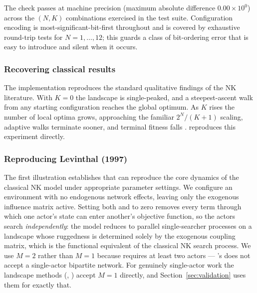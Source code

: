 \documentclass[
  article]{jss}
\begin{document}
The check passes at machine precision (maximum absolute difference
\(0.00 \times 10^{0}\)) across the \((N, K)\) combinations exercised in
the test suite. Configuration encoding is most-significant-bit-first
throughout and is covered by exhaustive round-trip tests for
\(N = 1, \ldots, 12\); this guards a class of bit-ordering error that is
easy to introduce and silent when it occurs.

\subsubsection{Recovering classical
results}\label{recovering-classical-results}

The implementation reproduces the standard qualitative findings of the
NK literature. With \(K = 0\) the landscape is single-peaked, and a
steepest-ascent walk from any starting configuration reaches the global
optimum. As \(K\) rises the number of local optima grows, approaching
the familiar \(2^N / (K+1)\) scaling, adaptive walks terminate sooner,
and terminal fitness falls
\citep{Kauffman1987, KauffmanWeinberger1989, Levinthal1997}.
 reproduces this experiment directly.

\subsubsection{Reproducing Levinthal (1997)}\label{sec:levinthal}

The first illustration establishes that  can reproduce
the core dynamics of the classical NK model under appropriate parameter
settings. We configure an environment with no endogenous network
effects, leaving only the exogenous influence matrix active. Setting
both  and  to zero removes every term
through which one actor's state can enter another's objective function,
so the actors search \emph{independently}: the model reduces to parallel
single-searcher processes on a landscape whose ruggedness is determined
solely by the exogenous coupling matrix, which is the functional
equivalent of the classical NK search process. We use \(M = 2\) rather
than \(M = 1\) because  requires at least two
actors --- 's  does not accept a
single-actor bipartite network. For genuinely single-actor work the
landscape methods (,
) accept \(M = 1\) directly, and
Section~\ref{sec:validation} uses them for exactly that.
\end{document}
